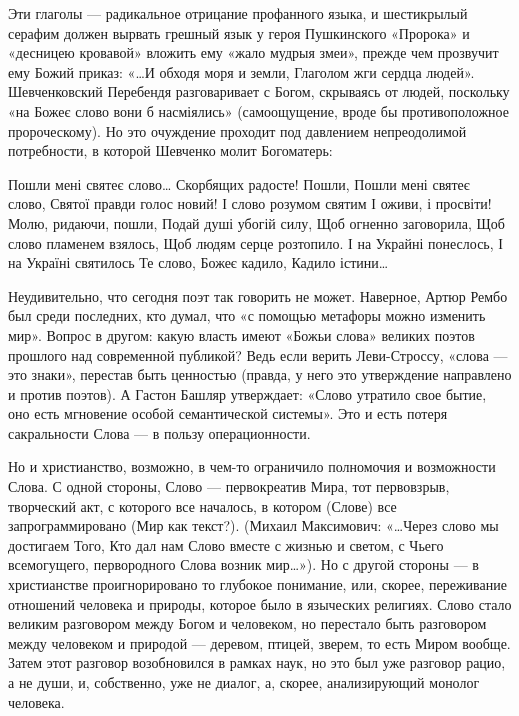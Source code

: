Эти глаголы — радикальное отрицание профанного языка, и шестикрылый серафим
должен вырвать грешный язык у героя Пушкинского «Пророка» и «десницею кровавой»
вложить ему «жало мудрыя змеи», прежде чем прозвучит ему Божий приказ: «…И
обходя моря и земли, Глаголом жги сердца людей». Шевченковский Перебендя
разговаривает с Богом, скрываясь от людей, поскольку «на Божеє слово вони б
насміялись» (самоощущение, вроде бы противоположное пророческому). Но это
очуждение проходит под давлением непреодолимой потребности, в которой Шевченко
молит Богоматерь:

Пошли мені святеє слово…
Скорбящих радосте! Пошли,
Пошли мені святеє слово,
Святої правди голос новий!
І слово розумом святим
І оживи, і просвіти!
Молю, ридаючи, пошли,
Подай душі убогій силу,
Щоб огненно заговорила,
Щоб слово пламенем взялось,
Щоб людям серце розтопило.
І на Украйні понеслось,
І на Україні святилось
Те слово, Божеє кадило,
Кадило істини…

Неудивительно, что сегодня поэт так говорить не может. Наверное, Артюр Рембо
был среди последних, кто думал, что «с помощью метафоры можно изменить мир».
Вопрос в другом: какую власть имеют «Божьи слова» великих поэтов прошлого над
современной публикой? Ведь если верить Леви-Строссу, «слова — это знаки»,
перестав быть ценностью (правда, у него это утверждение направлено и против
поэтов). А Гастон Башляр утверждает: «Слово утратило свое бытие, оно есть
мгновение особой семантической системы». Это и есть потеря сакральности Слова —
в пользу операционности.

Но и христианство, возможно, в чем-то ограничило полномочия и возможности
Слова. С одной стороны, Слово — первокреатив Мира, тот первовзрыв, творческий
акт, с которого все началось, в котором (Слове) все запрограммировано (Мир как
текст?). (Михаил Максимович: «…Через слово мы достигаем Того, Кто дал нам Слово
вместе с жизнью и светом, с Чьего всемогущего, первородного Слова возник
мир…»). Но с другой стороны — в христианстве проигнорировано то глубокое
понимание, или, скорее, переживание отношений человека и природы, которое было
в языческих религиях. Слово стало великим разговором между Богом и человеком,
но перестало быть разговором между человеком и природой — деревом, птицей,
зверем, то есть Миром вообще. Затем этот разговор возобновился в рамках наук,
но это был уже разговор рацио, а не души, и, собственно, уже не диалог, а,
скорее, анализирующий монолог человека.

